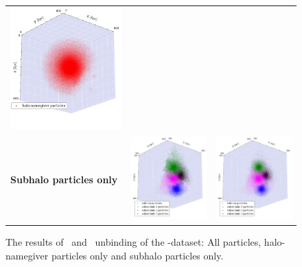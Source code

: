 \begin{subfigures}
\begin{figure}[!htbp]
{\begin{tabular}{|p{.5cm} c c|}
				{\includegraphics[width = .42\textwidth]{images/dice-sub/dice-sub-halo-only-nosaddle.png}} \hspace*{-1em}		\\
				\begin{sideways}{ \hspace{2cm}\textbf{Subhalo particles only} }\end{sideways}	 \hspace*{-1em}			 &
				{\includegraphics[width = .42\textwidth]{images/dice-sub/dice-sub-plot-subclumps-phew.png}} &
				{\includegraphics[width = .42\textwidth]{images/dice-sub/dice-sub-plot-subclumps-nosaddle.png}} \\
				\hline
			\end{tabular}
			\caption{\label{fig:dice_sub_results_a}The results of \phewon\ and \simple\ unbinding of the \ds-dataset: All particles, halo-namegiver particles only and subhalo particles only.}
}
\end{figure}
\end{subfigures}
